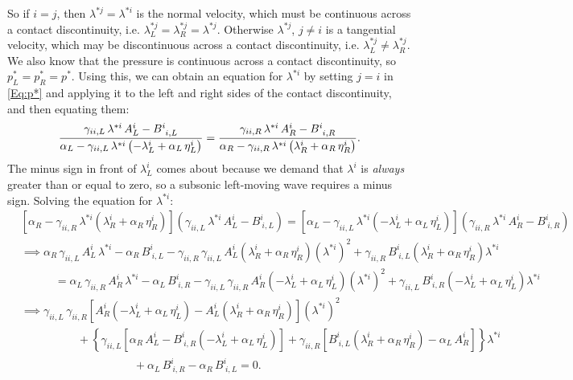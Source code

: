 \documentclass[10pt,preprint]{../aastex}
\begin{document}
So if $i=j$, then $\lambda^{*j}=\lambda^{*i}$ is the normal velocity, which must be continuous across a contact discontinuity, i.e. $\lambda^{*j}_{L}=\lambda^{*j}_{R}=\lambda^{*j}$. Otherwise $\lambda^{*j}$, $j\neq i$ is a tangential velocity, which may be discontinuous across a contact discontinuity, i.e. $\lambda^{*j}_{L}\neq\lambda^{*j}_{R}$. We also know that the pressure is continuous across a contact discontinuity, so $p^{*}_{L}=p^{*}_{R}=p^{*}$. Using this, we can obtain an equation for $\lambda^{*i}$ by setting $j=i$ in \eqref{Eq:p*} and applying it to the left and right sides of the contact discontinuity, and then equating them:
\begin{equation}
    \frac{\gamma_{ii,L}\,\lambda^{*i}\,A^{i}_{L}-B^{i}_{~i,L}}{\alpha_{L}-\gamma_{ii,L}\,\lambda^{*i}\left(-\lambda^{i}_{L}+\alpha_{L}\,\eta_{L}^{i}\right)}=\frac{\gamma_{ii,R}\,\lambda^{*i}\,A^{i}_{R}-B^{i}_{~i,R}}{\alpha_{R}-\gamma_{ii,R}\,\lambda^{*i}\left(\lambda^{i}_{R}+\alpha_{R}\,\eta_{R}^{i}\right)}.
\end{equation}
The minus sign in front of $\lambda^{i}_{L}$ comes about because we demand that $\lambda^{i}$ is \textit{always} greater than or equal to zero, so a subsonic left-moving wave requires a minus sign. 
Solving the equation for $\lambda^{*i}$:
\begin{align}
    &\left[\alpha_{R}-\gamma_{ii,R}\,\lambda^{*i}\left(\lambda^{i}_{R}+\alpha_{R}\,\eta_{R}^{i}\right)\right]\left(\gamma_{ii,L}\,\lambda^{*i}\,A^{i}_{L}-B^{i}_{~i,L}\right)=\left[\alpha_{L}-\gamma_{ii,L}\,\lambda^{*i}\left(-\lambda^{i}_{L}+\alpha_{L}\,\eta_{L}^{i}\right)\right]\left(\gamma_{ii,R}\,\lambda^{*i}\,A^{i}_{R}-B^{i}_{~i,R}\right)\nonumber\\
    &\implies \alpha_{R}\,\gamma_{ii,L}\,A^{i}_{L}\,\lambda^{*i}-\alpha_{R}\,B^{i}_{~i,L}-\gamma_{ii,R}\,\gamma_{ii,L}\,A^{i}_{L}\left(\lambda^{i}_{R}+\alpha_{R}\,\eta^{i}_{R}\right)\left(\lambda^{*i}\right)^{2}+\gamma_{ii,R}\,B^{i}_{~i,L}\left(\lambda^{i}_{R}+\alpha_{R}\,\eta^{i}_{R}\right)\lambda^{*i}\nonumber\\
    &\hspace{3em}=\alpha_{L}\,\gamma_{ii,R}\,A^{i}_{R}\,\lambda^{*i}-\alpha_{L}\,B^{i}_{~i,R}-\gamma_{ii,L}\,\gamma_{ii,R}\,A^{i}_{R}\left(-\lambda^{i}_{L}+\alpha_{L}\,\eta^{i}_{L}\right)\left(\lambda^{*i}\right)^{2}+\gamma_{ii,L}\,B^{i}_{~i,R}\left(-\lambda^{i}_{L}+\alpha_{L}\,\eta^{i}_{L}\right)\lambda^{*i}\nonumber\\
    &\implies\gamma_{ii,L}\,\gamma_{ii,R}\left[A^{i}_{R}\left(-\lambda^{i}_{L}+\alpha_{L}\,\eta^{i}_{L}\right)-A^{i}_{L}\left(\lambda^{i}_{R}+\alpha_{R}\,\eta^{i}_{R}\right)\right]\left(\lambda^{*i}\right)^{2}\nonumber\\
    &\hspace{5em}+\left\{\gamma_{ii,L}\left[\alpha_{R}\,A^{i}_{L}-B^{i}_{~i,R}\left(-\lambda^{i}_{L}+\alpha_{L}\,\eta^{i}_{L}\right)\right]+\gamma_{ii,R}\left[B^{i}_{~i,L}\left(\lambda^{i}_{R}+\alpha_{R}\,\eta^{i}_{R}\right)-\alpha_{L}\,A^{i}_{R}\right]\right\}\lambda^{*i}\nonumber\\
    &\hspace{10em}+\alpha_{L}\,B^{i}_{~i,R}-\alpha_{R}\,B^{i}_{~i,L}=0.
\end{align}
\end{document}
